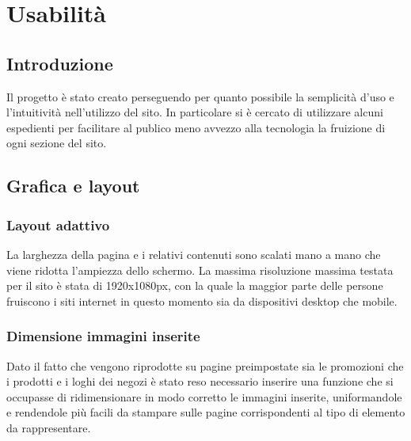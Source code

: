\documentclass[a4paper,12pt]{article}
\begin{document}
\section{Usabilità}
\subsection{Introduzione}
Il progetto è stato creato perseguendo per quanto possibile la semplicità d'uso e l'intuitività nell'utilizzo del sito. In particolare si è cercato di utilizzare alcuni espedienti per facilitare al publico meno avvezzo alla tecnologia la fruizione di ogni sezione del sito.
\subsection{Grafica e layout}
\subsubsection{Layout adattivo}
La larghezza della pagina e i relativi contenuti sono scalati mano a mano che viene ridotta l'ampiezza dello schermo. La massima risoluzione massima testata per il sito è stata di 1920x1080px, con la quale la maggior parte delle persone fruiscono i siti internet in questo momento sia da dispositivi desktop che mobile.
\subsubsection{Dimensione immagini inserite}
Dato il fatto che vengono riprodotte su pagine preimpostate sia le promozioni che i prodotti e i loghi dei negozi è stato reso necessario inserire una funzione che si occupasse di ridimensionare in modo corretto le immagini inserite, uniformandole e rendendole più facili da stampare sulle pagine corrispondenti al tipo di elemento da rappresentare.
\end{document}

